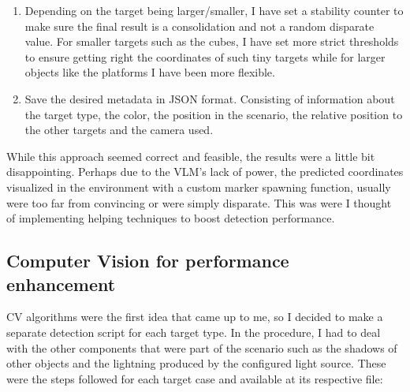 \begin{enumerate}
\begin{itemize}
		\item $\mathbf{T}_{cam}$ is the extrinsic transformation matrix of the camera (a $4 \times 4$ matrix encoding the rotation and translation within the simulator). Extrinsic matrices are those who position the camera in the real world/scenario, while the intrinsic are the ones used for focal and principal points \cite{Simek2012Extrinsic}. 
		
		\item $\mathbf{P}_{world}$ is the resulting vector containing the final $(X, Y, Z)$ coordinates in the Isaac Sim global 3D coordinate system.
	\end{itemize}
	
	\item Depending on the target being larger/smaller, I have set a stability counter to make sure the final result is a consolidation and not a random disparate value. For smaller targets such as the cubes, I have set more strict thresholds to ensure getting right the coordinates of such tiny targets while for larger objects like the platforms I have been more flexible. 
	
	\item Save the desired metadata in JSON format. Consisting of information about the target type, the color, the position in the scenario, the relative position to the other targets and the camera used. 
\end{enumerate}

While this approach seemed correct and feasible, the results were a little bit disappointing. Perhaps due to the VLM's lack of power, the predicted coordinates visualized in the environment with a custom marker spawning function, usually were too far from convincing or were simply disparate. This was were I thought of implementing helping techniques to boost detection performance. 

\subsection{Computer Vision for performance enhancement}
\label{sec:cv}
CV algorithms were the first idea that came up to me, so I decided to make a separate detection script for each target type. In the procedure, I had to deal with the other components that were part of the scenario such as the shadows of other objects and the lightning produced by the configured light source. These were the steps followed for each target case and available at its respective file:

